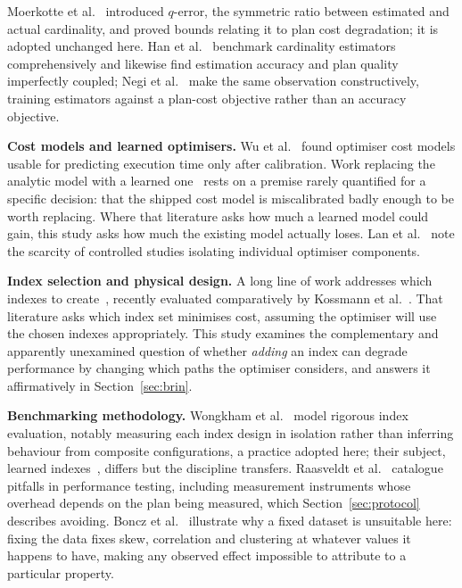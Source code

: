 \documentclass[12pt, a4paper]{article}
\begin{document}
Moerkotte et al.~\cite{moerkotte2009preventing} introduced $q$-error,
the symmetric ratio between estimated and actual cardinality, and proved
bounds relating it to plan cost degradation; it is adopted unchanged
here. Han et al.~\cite{han2021cardinality} benchmark cardinality estimators
comprehensively and likewise find estimation accuracy and plan quality
imperfectly coupled; Negi et al.~\cite{negi2021flow} make the same
observation constructively, training estimators against a plan-cost
objective rather than an accuracy objective.

\textbf{Cost models and learned optimisers.} Wu et
al.~\cite{wu2013predicting} found optimiser cost models usable for
predicting execution time only after calibration. Work replacing the analytic model with a learned
one~\cite{marcus2019neo, marcus2021bao} rests on a premise rarely
quantified for a specific decision: that the shipped cost model is
miscalibrated badly enough to be worth replacing. Where that literature
asks how much a learned model could gain, this study asks how much the
existing model actually loses. Lan et
al.~\cite{lan2021survey} note the scarcity of controlled studies
isolating individual optimiser components.

\textbf{Index selection and physical design.} A long line of work
addresses which indexes to create~\cite{chaudhuri1997efficient},
recently evaluated comparatively by Kossmann et
al.~\cite{kossmann2020magic}. That literature asks which index set minimises cost, assuming the
optimiser will use the chosen indexes appropriately. This study examines the complementary and
apparently unexamined question of whether \emph{adding} an index can
degrade performance by changing which paths the optimiser considers, and
answers it affirmatively in Section~\ref{sec:brin}.

\textbf{Benchmarking methodology.} Wongkham et
al.~\cite{wongkham2022updatable} model rigorous index evaluation,
notably measuring each index design in isolation rather than inferring
behaviour from composite configurations, a practice adopted here; their
subject, learned indexes~\cite{kraska2018case}, differs but the
discipline transfers. Raasveldt et al.~\cite{raasveldt2018fair}
catalogue pitfalls in performance testing, including measurement
instruments whose overhead depends on the plan being measured, which
Section~\ref{sec:protocol} describes avoiding. Boncz et al.~\cite{boncz2013tpch} illustrate why a fixed dataset is
unsuitable here: fixing the
data fixes skew, correlation and clustering at whatever values it
happens to have, making any observed effect impossible to attribute to a
particular property.
\end{document}
